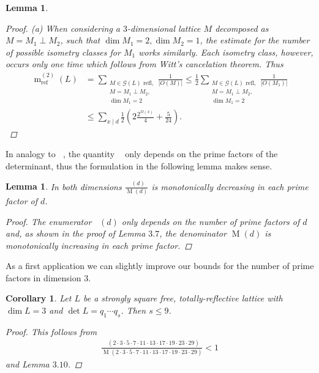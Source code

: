 \documentclass{amsart}
\newtheorem{cor}[thm]{Corollary}
\newtheorem{lem}[thm]{Lemma}
\theoremstyle{definition}
\theoremstyle{remark}
\def\CG{{\mathcal G}}
\def\CG{{\mathcal G}}
\DeclareMathOperator{\m}{m}
\DeclareMathOperator{\M}{M}
\DeclareMathOperator{\Mref}{M_{ref}}
\DeclareMathOperator{\Nref}{N_{ref}}
\begin{document}
\begin{lem}
\begin{proof}
  (a) When considering a $3$-dimensional lattice $M$ decomposed as $M = M_1 \perp M_2$, such that $\dim M_1 =2, \dim M_2 =1$, the estimate for the number of possible isometry classes for $M_1$
      works similarly. Each isometry class, however, occurs only one time which follows from Witt's cancelation theorem. Thus 
  \begin{align*} \m^{(2)}_{\mathrm{ref}}(L) &= \sum_{\substack{\text{$M \in \CG(L)$ refl,} \\M = M_1 \perp M_2,\\ \dim M_1=2}} \frac{1}{|O(M)|} 
                                             \leq \frac{1}{2} \sum_{\substack{\text{$M \in \CG(L)$ refl,} \\M = M_1 \perp M_2,\\ \dim M_1=2}} \frac{1}{|O(M_1)|} \\
                                            & \leq \sum_{x \mid d} \frac{1}{2} \left( 2\frac{2^{\Omega(x)}}{4} + \frac{5}{24} \right).
  \end{align*}
 \end{proof}
\end{lem}
In analogy to $\Mref$, the quantity $\Nref$ only depends on the prime factors of the determinant, thus the formulation in the following lemma makes sense.
\begin{lem}
 In both dimensions $\frac{\Nref(d)}{\M(d)}$ is monotonically decreasing in each prime factor of $d$.
 \begin{proof}
   The enumerator $\Nref(d)$ only depends on the number of prime factors of $d$ and, as shown in the proof of Lemma $3.7$, the denominator $\M(d)$ is monotonically increasing in each prime factor.
 \end{proof}
\end{lem}
As a first application we can slightly improve our bounds for the number of prime factors in dimension $3$.
\begin{cor}
 Let $L$ be a strongly square free, totally-reflective lattice with $\dim L=3$ and $\det L =q_1 \cdots q_s$. Then $s \leq 9$.
 \begin{proof}
  This follows from 
  \begin{align*}
   \frac{\Nref(2 \cdot 3 \cdot 5 \cdot 7 \cdot 11 \cdot 13 \cdot 17 \cdot 19 \cdot 23 \cdot 29)}{\M(2 \cdot 3 \cdot 5 \cdot 7 \cdot 11 \cdot 13 \cdot 17 \cdot 19 \cdot 23 \cdot 29)} < 1
  \end{align*}
  and Lemma $3.10$.
 \end{proof}
\end{cor}
\end{document}
